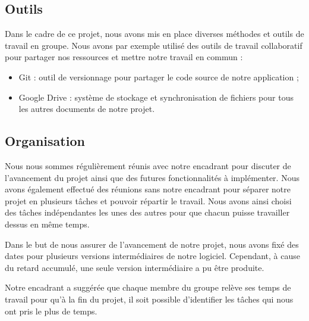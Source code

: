 \subsection{Outils}

Dans le cadre de ce projet, nous avons mis en place diverses méthodes et outils de travail en groupe. Nous avons par exemple utilisé des outils de travail collaboratif pour partager nos ressources et mettre notre travail en commun :
\begin{itemize}
        \item Git : outil de versionnage pour partager le code source de notre application ;
        \item Google Drive : système de stockage et synchronisation de fichiers pour tous les autres documents de notre projet.
\end{itemize}

\subsection{Organisation}

Nous nous sommes régulièrement réunis avec notre encadrant pour discuter de l’avancement du projet ainsi que des futures fonctionnalités à implémenter. Nous avons également effectué des réunions sans notre encadrant pour séparer notre projet en plusieurs tâches et pouvoir répartir le travail. Nous avons ainsi choisi des tâches indépendantes les unes des autres pour que chacun puisse travailler dessus en même temps.

Dans le but de nous assurer de l'avancement de notre projet, nous avons fixé des dates pour plusieurs versions intermédiaires de notre logiciel. Cependant, à cause du retard accumulé, une seule version intermédiaire a pu être produite.

Notre encadrant a suggérée que chaque membre du groupe relève ses temps de travail pour qu'à la fin du projet, il soit possible d'identifier les tâches qui nous ont pris le plus de temps.

